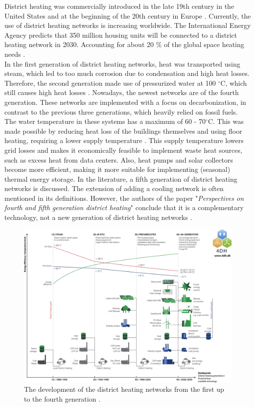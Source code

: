 District heating was commercially introduced in the late 19th century in the United States and at the beginning of the 20th century in Europe \cite{bookMax}. Currently, the use of district heating networks is increasing worldwide. The International Energy Agency predicts that 350 million housing units will be connected to a district heating network in 2030. Accounting for about 20 $\%$ of the global space heating needs \cite{IEAheating}. \\

In the first generation of district heating networks, heat was transported using steam, which led to too much corrosion due to condensation and high heat losses. Therefore, the second generation made use of pressurized water at 100 $^{\circ}\text{C}$, which still causes high heat losses \cite{FemkeJanssenLit}. Nowadays, the newest networks are of the fourth generation. These networks are implemented with a focus on decarbonization, in contrast to the previous three generations, which heavily relied on fossil fuels. The water temperature in these systems has a maximum of 60 - 70$^{\circ}\text{C}$. This was made possible by reducing heat loss of the buildings themselves and using floor heating, requiring a lower supply temperature \cite{FemkeJanssenLit}. This supply temperature lowers grid losses and makes it economically feasible to implement waste heat sources, such as excess heat from data centers. Also, heat pumps and solar collectors become more efficient, making it more suitable for implementing (seasonal) thermal energy storage. In the literature, a fifth generation of district heating networks is discussed. The extension of adding a cooling network is often mentioned in its definitions. However, the authors of the paper "\textit{Perspectives on fourth and fifth generation district heating}" conclude that it is a complementary technology, not a new generation of district heating networks \cite{4GDH5GDH}. 

\begin{figure}[h]
    \centering
    \includegraphics[width=0.5\linewidth]{figuresLIT/GDH.jpg}
    \caption{The development of the district heating networks from the first up to the fourth generation \cite{4GDH5GDH}.}
    \label{fig:devDHN}
\end{figure}

